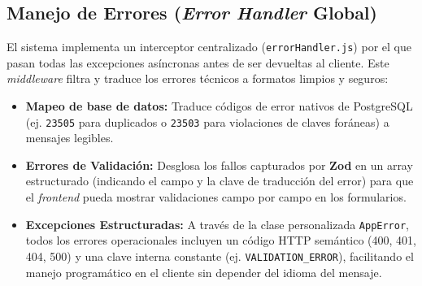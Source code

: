 \subsection{Manejo de Errores (\textit{Error Handler} Global)}
El sistema implementa un interceptor centralizado (\texttt{errorHandler.js}) por el que pasan todas las excepciones asíncronas antes de ser devueltas al cliente. Este \textit{middleware} filtra y traduce los errores técnicos a formatos limpios y seguros:
\begin{itemize}
    \item \textbf{Mapeo de base de datos:} Traduce códigos de error nativos de PostgreSQL (ej. \texttt{23505} para duplicados o \texttt{23503} para violaciones de claves foráneas) a mensajes legibles.
    \item \textbf{Errores de Validación:} Desglosa los fallos capturados por \textbf{Zod} en un array estructurado (indicando el campo y la clave de traducción del error) para que el \textit{frontend} pueda mostrar validaciones campo por campo en los formularios.
    \item \textbf{Excepciones Estructuradas:} A través de la clase personalizada \texttt{AppError}, todos los errores operacionales incluyen un código HTTP semántico (400, 401, 404, 500) y una clave interna constante (ej. \texttt{VALIDATION\_ERROR}), facilitando el manejo programático en el cliente sin depender del idioma del mensaje.
\end{itemize}

